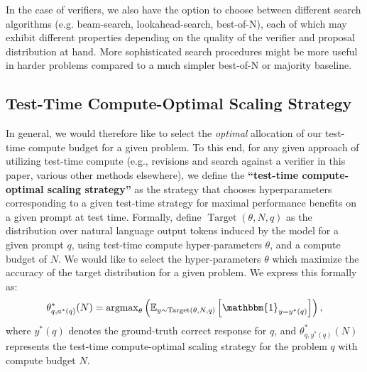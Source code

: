 In the case of verifiers, we also have the option to choose between different search algorithms (e.g. beam-search, lookahead-search, best-of-N), each of which may exhibit different properties depending on the quality of the verifier and proposal distribution at hand. More sophisticated search procedures might be more useful in harder problems compared to a much simpler best-of-N or majority baseline.

\vspace{-0.3cm}
\subsection{Test-Time Compute-Optimal Scaling Strategy}
\vspace{-0.2cm}
In general, we would therefore like to select the \emph{optimal} allocation of our test-time compute budget for a given problem. To this end, for any given approach of utilizing test-time compute (e.g., revisions and search against a verifier in this paper, various other methods elsewhere), we define the \textbf{``test-time compute-optimal scaling strategy''} as the strategy that chooses hyperparameters corresponding to a given test-time strategy for maximal performance benefits on a given prompt at test time. Formally, define $\operatorname{Target}(\theta, N, q)$ as the distribution over natural language output tokens induced by the model for a given prompt $q$, using test-time compute hyper-parameters $\theta$, and a compute budget of $N$. We would like to select the hyper-parameters $\theta$ which maximize the accuracy of the target distribution for a given problem. We express this formally as:
\begin{align}
\label{eq:test_time_compute_optimal}
    \theta^{*}_{q,a^*(q)}(N) = \operatorname{argmax}_{\theta} \left( \mathbb{E}_{y \sim \operatorname{Target}(\theta, N, q)} \left[ \mathbbm{1}_{y = y^*(q)} \right] \right),
\end{align}
where $y^*(q)$ denotes the ground-truth correct response for $q$, and $\theta^{*}_{q,y^*(q)}(N)$ represents the test-time compute-optimal scaling strategy for the problem $q$ with compute budget $N$.


\vspace{-0.2cm}
